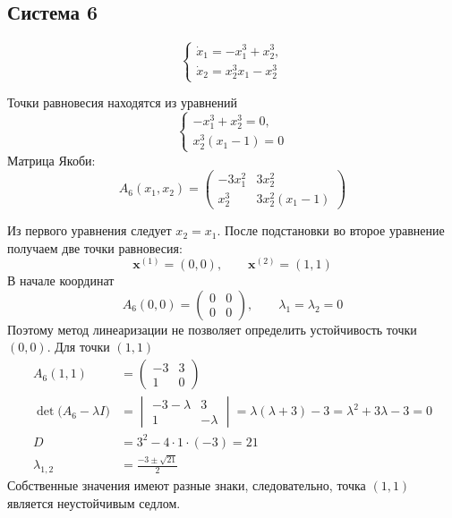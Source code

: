 
\subsection{Система 6}

\begin{equation}
  \begin{cases}
    \dot x_1=-x_1^3+x_2^3,\\
    \dot x_2=x_2^3x_1-x_2^3
  \end{cases}
  \label{eq:system-6}
\end{equation}

Точки равновесия находятся из уравнений
\begin{equation}
  \begin{cases}
    -x_1^3+x_2^3=0,\\
    x_2^3(x_1-1)=0
  \end{cases}
\end{equation}
Матрица Якоби:
\begin{equation}
  A_6(x_1,x_2)=
  \begin{pmatrix}
    -3x_1^2 & 3x_2^2\\
    x_2^3 & 3x_2^2(x_1-1)
  \end{pmatrix}
\end{equation}

Из первого уравнения следует $x_2=x_1$. После подстановки во второе
уравнение получаем две точки равновесия:
\begin{equation}
  \bm x^{(1)}=(0,0),\qquad
  \bm x^{(2)}=(1,1)
\end{equation}
В начале координат
\begin{equation}
  A_6(0,0)=
  \begin{pmatrix}
    0 & 0\\
    0 & 0
  \end{pmatrix},
  \qquad
  \lambda_1=\lambda_2=0
\end{equation}
Поэтому метод линеаризации не позволяет определить устойчивость точки
$(0,0)$. Для точки $(1,1)$
\begin{equation}
  \begin{aligned}
    A_6(1,1)&=
    \begin{pmatrix}
      -3 & 3\\
      1 & 0
    \end{pmatrix}\\
    \det\bigl(A_6-\lambda I\bigr)
    &=
    \begin{vmatrix}
      -3-\lambda & 3\\
      1 & -\lambda
    \end{vmatrix}
    =\lambda(\lambda+3)-3
    =\lambda^2+3\lambda-3=0\\
    D&=3^2-4\cdot 1\cdot(-3)=21\\
    \lambda_{1,2}&=\frac{-3\pm\sqrt{21}}{2}
  \end{aligned}
\end{equation}
Собственные значения имеют разные знаки, следовательно, точка $(1,1)$
является неустойчивым седлом.

